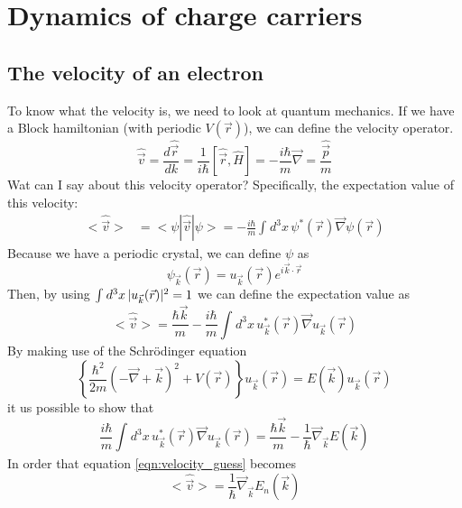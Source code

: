 \chapter{Dynamics of charge carriers}
\section{The velocity of an electron}
To know what the velocity is, we need to look at quantum mechanics. If we have a Block hamiltonian (with periodic $V(\vec{r})$), we can define the velocity operator.
\begin{equation}
	\hat{\vec{v}} = \frac{d\hat{\vec{r}}}{dk} = \frac{1}{i\hbar}\left[\hat{\vec{r}}, \hat{H}\right] = -\frac{i\hbar}{m}\vec{\nabla} = \frac{\hat{\vec{p}}}{m}
\end{equation}
Wat can I say about this velocity operator? Specifically, the expectation value of this velocity:
\begin{align}
	<\hat{\vec{v}}> &= <\psi|\hat{\vec{v}}|\psi> = -\frac{i\hbar}{m}\int_{}^{} d^3x\, \psi^*(\vec{r}) \vec{\nabla} \psi(\vec{r})
\end{align}
Because we have a periodic crystal, we can define $\psi$ as
\begin{equation}
	\psi_{\vec{k}}(\vec{r}) = u_{\vec{k}}(\vec{r})e^{i\vec{k}\cdot\vec{r}}
\end{equation}
Then, by using $\int_{}^{}d^3x\, \lvert u_{\vec{k}}(\vec{r})\rvert^2 = 1$ we can define the expectation value as
\begin{equation}
	<\hat{\vec{v}}> = \frac{\hbar\vec{k}}{m} - \frac{i\hbar}{m}\int_{}^{}d^3x\, u_{\vec{k}}^*(\vec{r}) \vec{\nabla} u_{\vec{k}}(\vec{r}) \label{eqn:velocity_guess}
\end{equation}
By making use of the Schrödinger equation
\begin{equation*}
	\left\{\frac{\hbar^2}{2m}\left(-\vec{\nabla} + \vec{k}\right)^2 + V(\vec{r})\right\}u_{\vec{k}}(\vec{r}) = E(\vec{k})u_{\vec{k}}(\vec{r})
\end{equation*}
it us possible to show that
\begin{equation*}
	\frac{i\hbar}{m}\int_{}^{}d^3x\, u_{\vec{k}}^*(\vec{r}) \vec{\nabla} u_{\vec{k}}(\vec{r}) = \frac{\hbar\vec{k}}{m} - \frac{1}{\hbar}\vec{\nabla}_{\vec{k}}E(\vec{k})
\end{equation*}
In order that equation \ref{eqn:velocity_guess} becomes
\begin{equation}
	<\hat{\vec{v}}> = \frac{1}{\hbar}\vec{\nabla}_{\vec{k}}E_n(\vec{k})
\end{equation}
